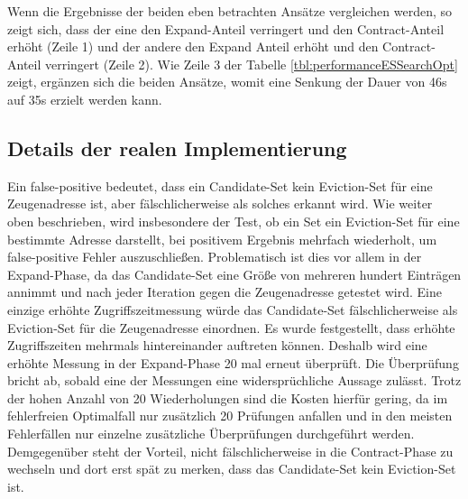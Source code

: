 Wenn die Ergebnisse der beiden eben betrachten Ansätze vergleichen werden, so zeigt sich, dass der eine den Expand-Anteil verringert und den Contract-Anteil erhöht (Zeile 1) und der andere den Expand Anteil erhöht und den Contract-Anteil verringert (Zeile 2).
Wie Zeile 3 der Tabelle \ref{tbl:performanceESSearchOpt} zeigt, ergänzen sich die beiden Ansätze, womit eine Senkung der Dauer von 46s auf 35s erzielt werden kann.




\subsection{Details der realen Implementierung}

Ein false-positive bedeutet, dass ein Candidate-Set kein Eviction-Set für eine Zeugenadresse ist, aber fälschlicherweise als solches erkannt wird.
Wie weiter oben beschrieben, wird insbesondere der Test, ob ein Set ein Eviction-Set für eine bestimmte Adresse darstellt, bei positivem Ergebnis mehrfach wiederholt, um false-positive Fehler auszuschließen. 
Problematisch ist dies vor allem in der Expand-Phase, da das Candidate-Set eine Größe von mehreren hundert Einträgen annimmt und nach jeder Iteration gegen die Zeugenadresse getestet wird. 
Eine einzige erhöhte Zugriffszeitmessung würde das Candidate-Set fälschlicherweise als Eviction-Set für die Zeugenadresse einordnen. 
Es wurde festgestellt, dass erhöhte Zugriffszeiten mehrmals hintereinander auftreten können. Deshalb wird eine erhöhte Messung in der Expand-Phase 20 mal erneut überprüft. 
Die Überprüfung bricht ab, sobald eine der Messungen eine widersprüchliche Aussage zulässt.
Trotz der hohen Anzahl von 20 Wiederholungen sind die Kosten hierfür gering, da im fehlerfreien Optimalfall nur zusätzlich 20 Prüfungen anfallen und in den meisten Fehlerfällen nur einzelne zusätzliche Überprüfungen durchgeführt werden. 
Demgegenüber steht der Vorteil, nicht fälschlicherweise in die Contract-Phase zu wechseln und dort erst spät zu merken, dass das Candidate-Set kein Eviction-Set ist.

